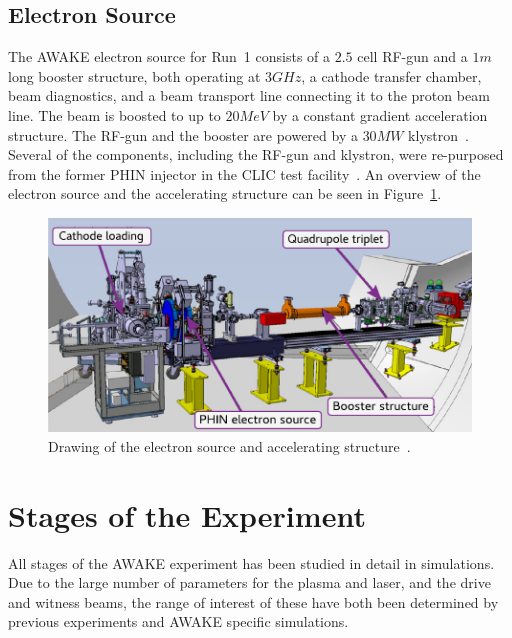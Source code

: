\subsection{Electron Source}
\label{WFA:Design:ESource}

The AWAKE electron source for Run~1 consists of a $2.5$ cell RF-gun and a $1\unit{m}$ long booster structure, both operating at $3\unit{GHz}$, a cathode transfer chamber, beam diagnostics, and a beam transport line connecting it to the proton beam line.
The beam is boosted to up to $20\unit{MeV}$ by a constant gradient acceleration structure.
The RF-gun and the booster are powered by a $30\unit{MW}$ klystron~\cite{awake_collaboration:2017,pepitone:2016}.
Several of the components, including the RF-gun and klystron, were re-purposed from the former PHIN injector in the CLIC test facility~\cite{chevallay:2012}.
An overview of the electron source and the accelerating structure can be seen in Figure~\ref{Fig:WFA:ESource}.

\begin{figure}[hbt]
    \centering
    \includegraphics[width=0.70\linewidth,trim={0mm 0mm 0mm 0mm},clip]{figures/ElectronSource}
    \caption{\label{Fig:WFA:ESource}
        Drawing of the electron source and accelerating structure~\cite{pepitone:2016}.
    }
\end{figure}

\section{Stages of the Experiment}
\label{WFA:AWAKE}

All stages of the AWAKE experiment has been studied in detail in simulations.
Due to the large number of parameters for the plasma and laser, and the drive and witness beams, the range of interest of these have both been determined by previous experiments and AWAKE specific simulations.

